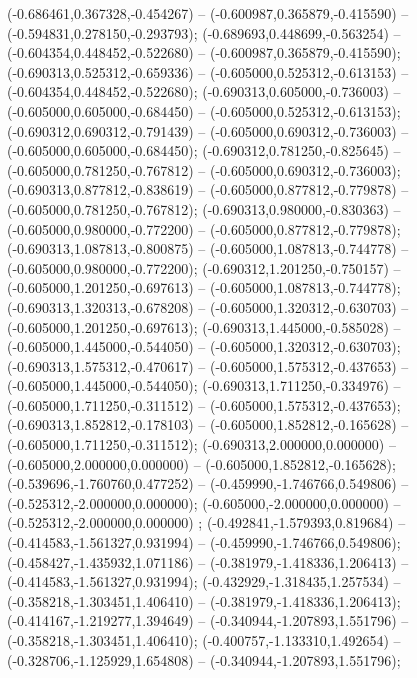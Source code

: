  (-0.686461,0.367328,-0.454267) -- (-0.600987,0.365879,-0.415590) -- (-0.594831,0.278150,-0.293793);
 (-0.689693,0.448699,-0.563254) -- (-0.604354,0.448452,-0.522680) -- (-0.600987,0.365879,-0.415590);
 (-0.690313,0.525312,-0.659336) -- (-0.605000,0.525312,-0.613153) -- (-0.604354,0.448452,-0.522680);
 (-0.690313,0.605000,-0.736003) -- (-0.605000,0.605000,-0.684450) -- (-0.605000,0.525312,-0.613153);
 (-0.690312,0.690312,-0.791439) -- (-0.605000,0.690312,-0.736003) -- (-0.605000,0.605000,-0.684450);
 (-0.690312,0.781250,-0.825645) -- (-0.605000,0.781250,-0.767812) -- (-0.605000,0.690312,-0.736003);
 (-0.690313,0.877812,-0.838619) -- (-0.605000,0.877812,-0.779878) -- (-0.605000,0.781250,-0.767812);
 (-0.690313,0.980000,-0.830363) -- (-0.605000,0.980000,-0.772200) -- (-0.605000,0.877812,-0.779878);
 (-0.690313,1.087813,-0.800875) -- (-0.605000,1.087813,-0.744778) -- (-0.605000,0.980000,-0.772200);
 (-0.690312,1.201250,-0.750157) -- (-0.605000,1.201250,-0.697613) -- (-0.605000,1.087813,-0.744778);
 (-0.690313,1.320313,-0.678208) -- (-0.605000,1.320312,-0.630703) -- (-0.605000,1.201250,-0.697613);
 (-0.690313,1.445000,-0.585028) -- (-0.605000,1.445000,-0.544050) -- (-0.605000,1.320312,-0.630703);
 (-0.690313,1.575312,-0.470617) -- (-0.605000,1.575312,-0.437653) -- (-0.605000,1.445000,-0.544050);
 (-0.690313,1.711250,-0.334976) -- (-0.605000,1.711250,-0.311512) -- (-0.605000,1.575312,-0.437653);
 (-0.690313,1.852812,-0.178103) -- (-0.605000,1.852812,-0.165628) -- (-0.605000,1.711250,-0.311512);
 (-0.690313,2.000000,0.000000) -- (-0.605000,2.000000,0.000000) -- (-0.605000,1.852812,-0.165628);
 (-0.539696,-1.760760,0.477252) -- (-0.459990,-1.746766,0.549806) -- (-0.525312,-2.000000,0.000000);
 (-0.605000,-2.000000,0.000000) -- (-0.525312,-2.000000,0.000000) ;
 (-0.492841,-1.579393,0.819684) -- (-0.414583,-1.561327,0.931994) -- (-0.459990,-1.746766,0.549806);
 (-0.458427,-1.435932,1.071186) -- (-0.381979,-1.418336,1.206413) -- (-0.414583,-1.561327,0.931994);
 (-0.432929,-1.318435,1.257534) -- (-0.358218,-1.303451,1.406410) -- (-0.381979,-1.418336,1.206413);
 (-0.414167,-1.219277,1.394649) -- (-0.340944,-1.207893,1.551796) -- (-0.358218,-1.303451,1.406410);
 (-0.400757,-1.133310,1.492654) -- (-0.328706,-1.125929,1.654808) -- (-0.340944,-1.207893,1.551796);
